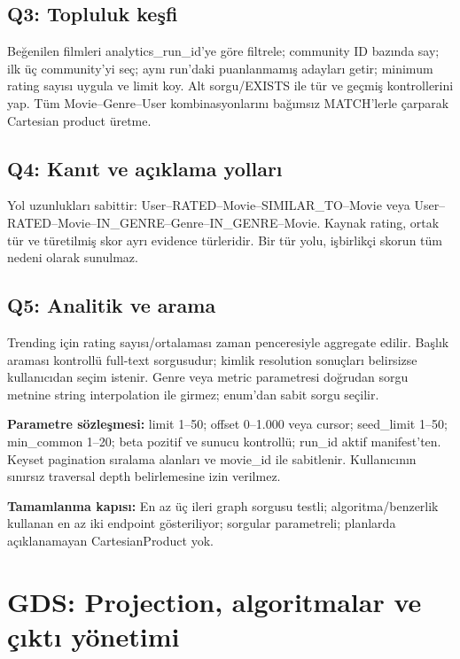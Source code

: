 \documentclass[11pt,a4paper]{article}
\newcommand{\gate}[1]{\par\smallskip\noindent\colorbox{pale}{\parbox{0.96\linewidth}{\textbf{Tamamlanma kapısı:} #1}}\par\smallskip}
\begin{document}
\subsection{Q3: Topluluk keşfi}
Beğenilen filmleri analytics\_run\_id'ye göre filtrele; community ID bazında say; ilk üç community'yi seç; aynı run'daki puanlanmamış adayları getir; minimum rating sayısı uygula ve limit koy. Alt sorgu/EXISTS ile tür ve geçmiş kontrollerini yap. Tüm Movie--Genre--User kombinasyonlarını bağımsız MATCH'lerle çarparak Cartesian product üretme.

\subsection{Q4: Kanıt ve açıklama yolları}
Yol uzunlukları sabittir: User--RATED--Movie--SIMILAR\_TO--Movie veya User--RATED--Movie--IN\_GENRE--Genre--IN\_GENRE--Movie. Kaynak rating, ortak tür ve türetilmiş skor ayrı evidence türleridir. Bir tür yolu, işbirlikçi skorun tüm nedeni olarak sunulmaz.

\subsection{Q5: Analitik ve arama}
Trending için rating sayısı/ortalaması zaman penceresiyle aggregate edilir. Başlık araması kontrollü full-text sorgusudur; kimlik resolution sonuçları belirsizse kullanıcıdan seçim istenir. Genre veya metric parametresi doğrudan sorgu metnine string interpolation ile girmez; enum'dan sabit sorgu seçilir.

\textbf{Parametre sözleşmesi:} limit 1--50; offset 0--1.000 veya cursor; seed\_limit 1--50; min\_common 1--20; beta pozitif ve sunucu kontrollü; run\_id aktif manifest'ten. Keyset pagination sıralama alanları ve movie\_id ile sabitlenir. Kullanıcının sınırsız traversal depth belirlemesine izin verilmez.

\gate{En az üç ileri graph sorgusu testli; algoritma/benzerlik kullanan en az iki endpoint gösteriliyor; sorgular parametreli; planlarda açıklanamayan CartesianProduct yok.}

\section{GDS: Projection, algoritmalar ve çıktı yönetimi}
\end{document}
